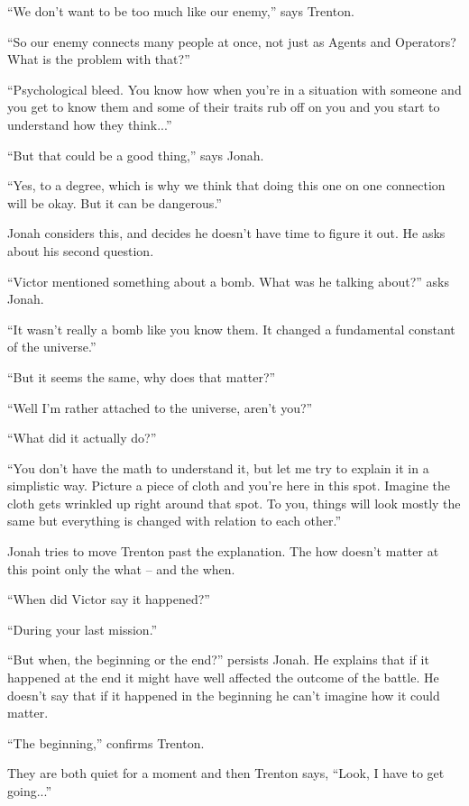 ``We don't want to be too much like our enemy,'' says Trenton.

``So our enemy connects many people at once, not just as Agents and Operators?  What is the problem with that?''

``Psychological bleed.  You know how when you're in a situation with someone and you get to know them and some of their traits rub off on you and you start to understand how they think...''

``But that could be a good thing,'' says Jonah.

``Yes, to a degree, which is why we think that doing this one on one connection will be okay.  But it can be dangerous.''

Jonah considers this, and decides he doesn't have time to figure it out.  He asks about his second question.

``Victor mentioned something about a bomb.  What was he talking about?'' asks Jonah.

``It wasn't really a bomb like you know them.  It changed a fundamental constant of the universe.''

``But it seems the same, why does that matter?''

``Well I'm rather attached to the universe, aren't you?''

``What did it actually do?''

``You don't have the math to understand it, but let me try to explain it in a simplistic way.  Picture a piece of cloth and you're here in this spot.  Imagine the cloth gets wrinkled up right around that spot.  To you, things will look mostly the same but everything is changed with relation to each other.''

Jonah tries to move Trenton past the explanation.  The how doesn't matter at this point only the what -- and the when.

``When did Victor say it happened?''

``During your last mission.''

``But when, the beginning or the end?'' persists Jonah.  He explains that if it happened at the end it might have well affected the outcome of the battle.  He doesn't say that if it happened in the beginning he can't imagine how it could matter.

``The beginning,'' confirms Trenton.

They are both quiet for a moment and then Trenton says, ``Look, I have to get going...''

